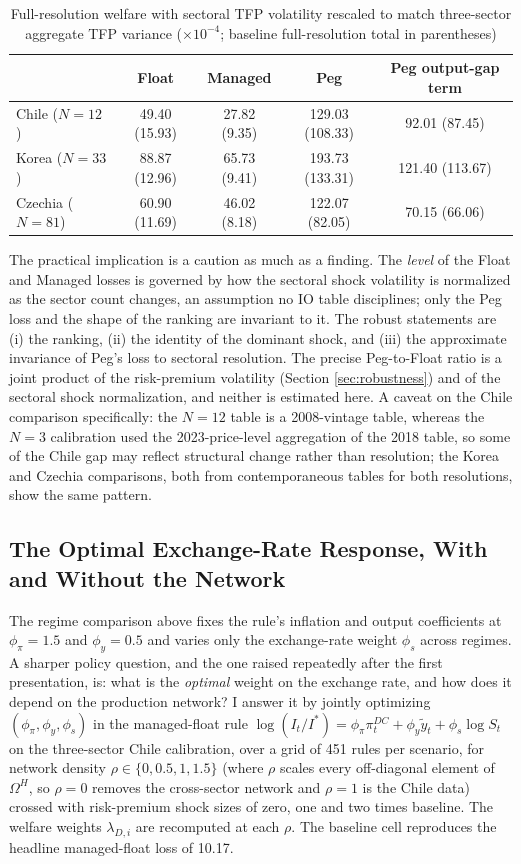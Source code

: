 \documentclass[12pt]{article}
\begin{document}
\begin{table}[H]
\centering
\caption{Full-resolution welfare with sectoral TFP volatility rescaled to match three-sector aggregate
TFP variance ($\times10^{-4}$; baseline full-resolution total in parentheses)}
\label{tab:scaled_tfp}
\begin{tabular}{lcccc}
\toprule
 & Float & Managed & Peg & Peg output-gap term \\
\midrule
Chile ($N=12$) & 49.40 (15.93) & 27.82 (9.35) & 129.03 (108.33) & 92.01 (87.45) \\
Korea ($N=33$) & 88.87 (12.96) & 65.73 (9.41) & 193.73 (133.31) & 121.40 (113.67) \\
Czechia ($N=81$) & 60.90 (11.69) & 46.02 (8.18) & 122.07 (82.05) & 70.15 (66.06) \\
\bottomrule
\end{tabular}
\end{table}

The practical implication is a caution as much as a finding. The \emph{level} of the Float and Managed
losses is governed by how the sectoral shock volatility is normalized as the sector count changes, an
assumption no IO table disciplines; only the Peg loss and the shape of the ranking are invariant to it.
The robust statements are (i) the ranking, (ii) the identity of the dominant shock, and (iii) the
approximate invariance of Peg's loss to sectoral resolution. The precise Peg-to-Float ratio is a joint
product of the risk-premium volatility (Section \ref{sec:robustness}) and of the sectoral shock
normalization, and neither is estimated here. A caveat on the Chile comparison specifically: the
$N=12$ table is a 2008-vintage table, whereas the $N=3$ calibration used the 2023-price-level
aggregation of the 2018 table, so some of the Chile gap may reflect structural change rather than
resolution; the Korea and Czechia comparisons, both from contemporaneous tables for both
resolutions, show the same pattern.

\subsection{The Optimal Exchange-Rate Response, With and Without the Network}
\label{sec:optrule}

The regime comparison above fixes the rule's inflation and output coefficients at $\phi_\pi=1.5$ and
$\phi_y=0.5$ and varies only the exchange-rate weight $\phi_s$ across regimes. A sharper policy question,
and the one raised repeatedly after the first presentation, is: what is the \emph{optimal} weight on the
exchange rate, and how does it depend on the production network? I answer it by jointly optimizing
$(\phi_\pi,\phi_y,\phi_s)$ in the managed-float rule
$\log(I_t/I^*)=\phi_\pi\pi^{DC}_t+\phi_y\tilde y_t+\phi_s\log S_t$ on the three-sector Chile calibration, over
a grid of 451 rules per scenario, for network density $\rho\in\{0,0.5,1,1.5\}$ (where $\rho$ scales every
off-diagonal element of $\Omega^H$, so $\rho=0$ removes the cross-sector network and $\rho=1$ is the Chile
data) crossed with risk-premium shock sizes of zero, one and two times baseline. The welfare weights
$\lambda_{D,i}$ are recomputed at each $\rho$. The baseline cell reproduces the headline managed-float loss of
10.17.
\end{document}
